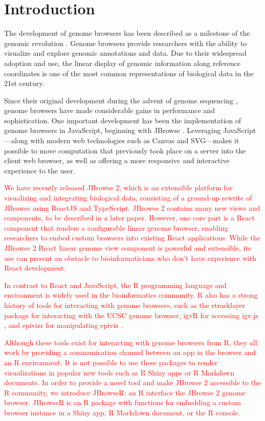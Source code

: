 \documentclass{bioinfo}
\begin{document}
\section{Introduction}

The development of genome browsers has been described as a milestone of
the genomic revolution \citep{packer2007clickable}. Genome browsers
provide researchers with the ability to visualize and explore genomic
annotations and data. Due to their widespread adoption and use, the
linear display of genomic information along reference coordinates is one
of the most common representations of biological data in the 21st
century.

Since their original development during the advent of genome sequencing
\citep{kent2002human, birney2004overview}, genome browsers have made
considerable gains in performance and sophistication. One important
development has been the implementation of genome browsers in
JavaScript, beginning with JBrowse \citep{buels2016jbrowse}. Leveraging
JavaScript---along with modern web technologies such as Canvas and
SVG---makes it possible to move computation that previously took place
on a server into the client web browser, as well as offering a more
responsive and interactive experience to the user.

\textcolor{red}{
We have recently released JBrowse 2, which is an extensible platform for visualizing 
and integrating biological data, consisting of a ground-up rewrite of JBrowse using ReactJS and TypeScript.
JBrowse 2 contains many new views and components, to be described in a later paper.
However, one core part is a React component that renders a configurable
linear genome browser, enabling researchers to embed custom browsers into existing React applications.
While the JBrowse 2 React linear genome view component is powerful and extensible, its use can
present an obstacle to bioinformaticians who don't have experience with React development.}

\textcolor{red}{
In contrast to React and JavaScript, the R programming language and environment is widely used in the 
bioinformatics community. R also has a strong history of tools for interacting with genome browsers,
such as the rtracklayer} \citep{lawrence2009rtracklayer}
\textcolor{red}{package for interacting with the 
UCSC genome browser, igvR for accessing igv.js}
\citep{robinson2011integrative, robinson2017variant},
\textcolor{red}{and epivizr for manipulating epiviz}
\citep{chelaru2014epiviz}.

\textcolor{red}{
Although these tools exist for interacting with genome browsers from R, they all work by
providing a communication channel between an app in the browser and an R environment. It is not possible
to use these packages to render visualizations in popular new tools such as R Shiny apps or R Markdown
documents. In order to provide a novel tool and make JBrowse 2 accessible to the R community, we
introduce JBrowseR: an R interface the JBrowse 2 genome browser. 
JBrowseR is an R package with functions for embedding a custom browser instance in a Shiny app, 
R Markdown document, or the R console.}
\end{document}
